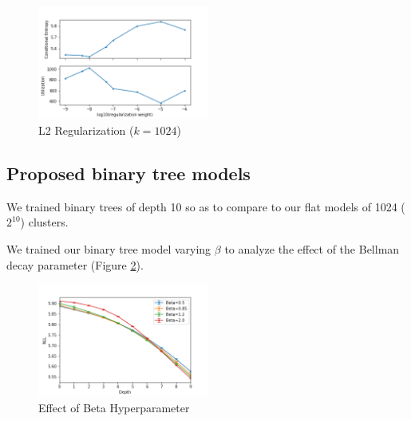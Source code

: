\documentclass[11pt,letterpaper]{article}
\begin{document}
\begin{figure}
  \caption{L2 Regularization ($k=1024$)}
\label{f:fl2}
  \centering
    \includegraphics[width=0.5\textwidth]{skipgram_flat_l2.png}
\end{figure}

\subsection{Proposed binary tree models}

We trained binary trees of depth 10 so as to compare to our flat models of 1024 ($2^{10}$) clusters.

We trained our binary tree model varying $\beta$ to analyze the effect of the Bellman decay parameter (Figure \ref{f:beta}). 

\begin{figure}
  \caption{Effect of Beta Hyperparameter}
\label{f:beta}
  \centering
    \includegraphics[width=0.5\textwidth]{skipgram_tree.png}
\end{figure}


\end{document}
